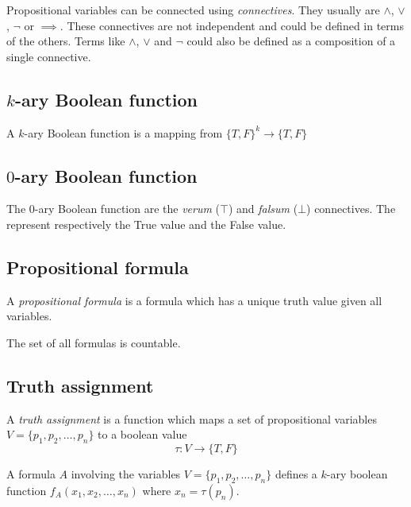 \documentclass[a4paper]{article}
\begin{document}
Propositional variables can be connected using \textit{connectives}.
They usually are \(\land\), \(\lor\), \(\lnot\) or \(\implies\).
These connectives are not independent and could be defined in terms of the others.
Terms like  \(\land\), \(\lor\) and \(\lnot\) could also be defined as a composition of a single connective.

\subsection{\(k\)-ary Boolean function}

A \(k\)-ary Boolean function is a mapping from \({\{T, F\}}^k \to \{T,F\}\)

\subsection{\(0\)-ary Boolean function}

The \(0\)-ary Boolean function are the \textit{verum} (\(\top\)) and \textit{falsum} (\(\bot\)) connectives.
The represent respectively the True value and the False value.

\subsection{Propositional formula}

A \textit{propositional formula} is a formula which has a unique truth value given all variables.

The set of all formulas is countable.

\subsection{Truth assignment}

A \textit{truth assignment} is a function which maps a set of propositional
variables \(V=\{p_1, p_2, \ldots, p_n\}\) to a boolean value
\[
    \tau: V \to \{T,F\}
\]

A formula \(A\) involving the variables \(V=\{p_1, p_2, \ldots, p_n\}\)
defines a \(k\)-ary boolean function \(f_A(x_1, x_2, \ldots, x_n)\) where \(x_n = \tau(p_n)\).



%
%
%
\end{document}
